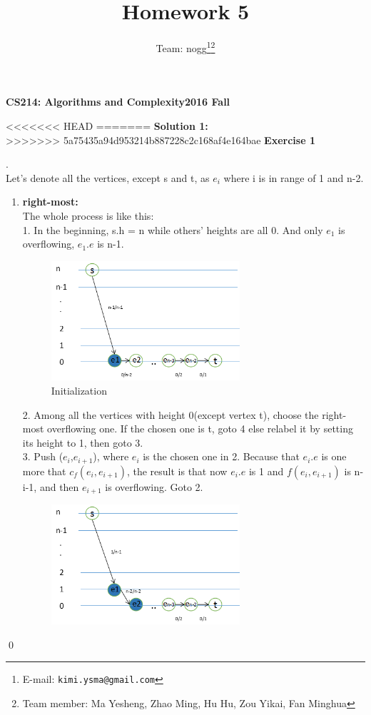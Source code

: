 \documentclass[12pt, notitlepage]{article}
\title{Homework 5}
\author{Team: nogg\footnote{E-mail: \texttt{kimi.ysma@gmail.com}}\footnote{Team member: Ma Yesheng, Zhao Ming, Hu Hu, Zou Yikai, Fan Minghua}}
\newenvironment{sol}
  {\par\vspace{3mm}\noindent{\it Solution}.}{\qed}
\begin{document}
{\bf\small CS214: Algorithms and Complexity}\hfill{\bf\small 2016 Fall}
{\let\newpage\relax\maketitle}

<<<<<<< HEAD
=======
\textbf{Solution 1:}\\
>>>>>>> 5a75435a94d953214b887228c2c168af4e164bae
\textbf{Exercise 1}
\begin{sol}\\
Let's denote all the vertices, except s and t, as $e_i$ where i is in range of 1 and n-2.
\begin{enumerate}
\item\textbf{right-most:}\\
The whole process is like this:\\
1. In the beginning, s.h = n while others' heights are all 0. And only $e_1$ is overflowing, $e_1.e$ is n-1.
	\begin{figure}[H]\centering
	\includegraphics[width=7cm]{1.png}
	\caption{Initialization}
	\end{figure}
2. Among all the vertices with height 0(except vertex t), choose the right-most overflowing one. If the chosen one is t, goto 4 else relabel it by setting its height to 1, then goto 3.\\
3. Push ($e_i$,$e_{i+1}$), where $e_i$ is the chosen one in 2. Because that $e_i.e$ is one more that $c_f(e_i,e_{i+1})$, the result is that now $e_i.e$ is 1 and $f(e_i,e_{i+1})$ is n-i-1, and then $e_{i+1}$ is overflowing. Goto 2.\\
	\begin{figure}[H]\centering
	\includegraphics[width=7cm]{2.png}

\end{figure}
\end{enumerate}
\end{sol}
\end{document}
